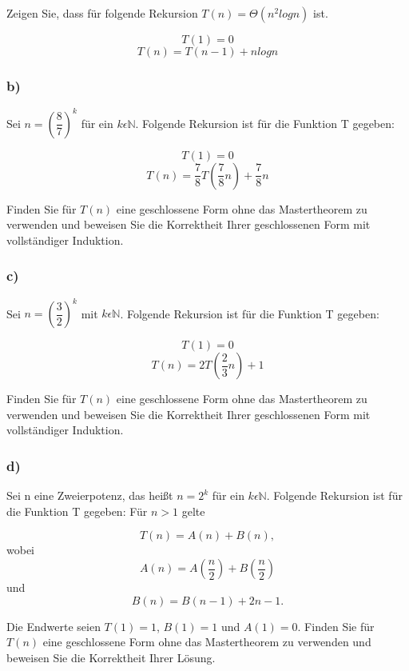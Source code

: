 \documentclass[paper=a4, fontsize=11pt]{scrartcl}
\numberwithin{equation}{section}
\numberwithin{figure}{section}
\numberwithin{table}{section}
\begin{document}
Zeigen Sie, dass für folgende Rekursion $T(n) = \Theta (n^{2} log n)$ ist. 

$$T(1) = 0$$ 
$$T(n) = T(n-1) + n log n $$

\subsubsection*{b)}

Sei $n = ( \dfrac{8}{7})^{k}$ für ein $k \epsilon \mathbb{N}$. Folgende Rekursion ist für die Funktion T gegeben:

$$T(1)=0$$
$$T(n)= \dfrac{7}{8} T(\dfrac{7}{8} n) + \dfrac{7}{8} n$$

Finden Sie für $T(n)$ eine geschlossene Form ohne das Mastertheorem zu verwenden und beweisen Sie die Korrektheit Ihrer geschlossenen Form mit vollständiger Induktion.

\subsubsection*{c)}

Sei $n = (\dfrac{3}{2})^{k}$ mit $k \epsilon \mathbb{N}$. Folgende Rekursion ist für die Funktion T gegeben:

$$T(1)=0$$
$$T(n)= 2T ( \dfrac{2}{3} n) + 1$$

Finden Sie für $T(n)$ eine geschlossene Form ohne das Mastertheorem zu verwenden und beweisen Sie die Korrektheit Ihrer geschlossenen Form mit vollständiger Induktion.

\subsubsection*{d)}

Sei n eine Zweierpotenz, das heißt $n = 2^{k}$ für ein $k \epsilon \mathbb{N}$. Folgende Rekursion ist für die Funktion T gegeben: Für $n > 1$ gelte

$$T(n) = A(n) + B(n) ,$$ wobei
$$A(n)=A(\dfrac{n}{2}) + B( \dfrac{n}{2})$$ und
$$B(n)=B(n-1)+2n-1.$$

Die Endwerte seien $T(1)=1$, $B(1)=1$ und $A(1)=0$. Finden Sie für $T(n)$ eine geschlossene Form ohne das Mastertheorem zu verwenden und beweisen Sie die Korrektheit Ihrer Lösung.

\end{document}
